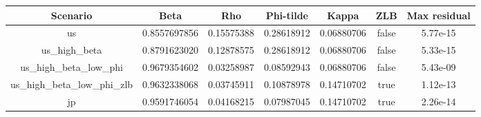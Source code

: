 \begin{table}[!ht]
\setlength\tabcolsep{0.425em}
\setlength\aboverulesep{0pt}
\setlength\belowrulesep{0.2em}
\centering
\begin{threeparttable}
\begin{tabular}{ccccccc}
\toprule[0.1em]
Scenario & Beta & Rho & Phi-tilde & Kappa & ZLB & Max residual \\[0.2em]
\midrule[0.075em]
us & 0.8557697856 & 0.15575388 & 0.28618912 & 0.06880706 & false & 5.77e-15 \\[0.2em]
us\_high\_beta & 0.8791623020 & 0.12878575 & 0.28618912 & 0.06880706 & false & 5.33e-15 \\[0.2em]
us\_high\_beta\_low\_phi & 0.9679354602 & 0.03258987 & 0.08592943 & 0.06880706 & false & 5.43e-09 \\[0.2em]
us\_high\_beta\_low\_phi\_zlb & 0.9632338068 & 0.03745911 & 0.10878978 & 0.14710702 & true & 1.12e-13 \\[0.2em]
jp & 0.9591746054 & 0.04168215 & 0.07987045 & 0.14710702 & true & 2.26e-14 \\[0.2em]
\bottomrule[0.1em]
\end{tabular}
\end{threeparttable}
\end{table}
